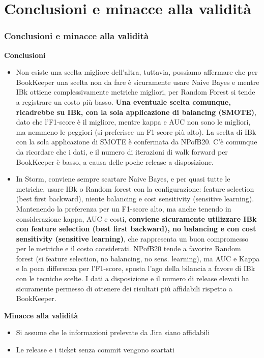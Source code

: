 \documentclass{beamer}
\begin{document}
\section{Conclusioni e minacce alla validità}
\begin{frame}
	\frametitle{Conclusioni e minacce alla validità}
	
	\fontsize{7pt}{8pt}\selectfont
	
	\textbf{Conclusioni}
	
	\begin{itemize}
		\item 
		Non esiste una scelta migliore dell'altra, tuttavia, possiamo affermare che per BookKeeper una scelta
		non da fare è sicuramente usare Naive Bayes e mentre IBk ottiene complessivamente metriche migliori, per
		Random Forest si tende a registrare un costo più basso. \textbf{Una eventuale scelta comunque, ricadrebbe su IBk,
		con la sola applicazione di balancing (SMOTE)}, dato che l'F1-score è il migliore, 
		mentre kappa e AUC non sono le
		migliori, ma nemmeno le peggiori (si preferisce un F1-score più alto).
		La scelta di IBk con la sola applicazione di SMOTE è confermata da NPofB20.
		C'è comunque da ricordare che
		i dati, e il numero di iterazioni di walk forward per BookKeeper è basso, a causa delle poche release
		a disposizione.
		
		\item
		In Storm, conviene sempre scartare Naive Bayes, e per quasi tutte le metriche, usare IBk o Random forest
		con la configurazione:
		feature selection (best first backward), niente balancing e cost sensitivity (sensitive learning).
		Mantenendo la preferenza per un F1-score alto, ma anche tenendo in considerazione kappa, AUC e costi,
		\textbf{conviene sicuramente utilizzare IBk con feature selection (best first backward), no balancing e 
		con cost sensitivity (sensitive learning)}, che rappresenta un buon compromesso per le metriche e il costo
		considerati. 
		NPofB20 tende a favorire Random forest (si feature selection, no balancing, no sens. learning),
		ma AUC e Kappa e la poca differenza per l'F1-score, sposta l'ago della bilancia a favore di IBk con le
		tecniche scelte.
		I dati a disposizione e il numero di release elevati ha sicuramente permesso di ottenere dei risultati più
		affidabili rispetto a BookKeeper.
	\end{itemize}
	
	\textbf{Minacce alla validità}
	
	\begin{itemize}
		\item Si assume che le informazioni prelevate da Jira siano affidabili
		\item Le release e i ticket senza commit vengono scartati
	\end{itemize}
	
\end{frame}
\end{document}
